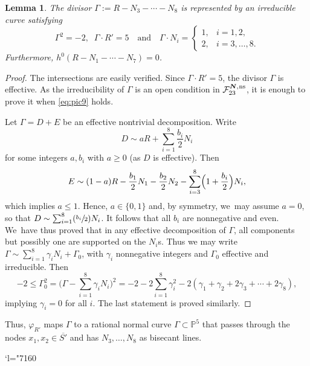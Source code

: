 \documentclass[JEP,XML,SOM,Unicode,NoEqCountersInSection,published]{cedram}
\newcommand{\Changel}{\mathcode`l="7160}
\newcommand{\Psfrac}[2]{(\sfrac{#1}{#2})}
\newcommand{\quand}{\quad\text{and}\quad}
\newcommand{\ns}{{\mkern1mu\mathrm{ns}}}
\newcommand{\bN}{\boldsymbol{N}}
\theoremstyle{plain}
\newtheorem{lemma}[thm]{Lemma}
\theoremstyle{definition}
\newcommand\PP{{\mathbb P}}
\newcommand\F{{\mathcal F}}
\begin{document}
\begin{lemma} \label{lemma:Juve-15}
The divisor $
\Gamma:=R-N_3-\cdots-N_8
$
is represented by an irreducible curve satisfying
\[
 \Gamma^2=-2, \;\; \Gamma\cdot R'=5 \quand\Gamma \cdot N_i =
\begin{cases}
1, & i=1,2, \\
2, & i=3,\ldots,8.
\end{cases}
\]
Furthermore, $h^0(R-N_1-\cdots-N_7)=0$.
\end{lemma}

\begin{proof}
The intersections are easily verified. Since $\Gamma \cdot R'=5$, the divisor $\Gamma$ is effective.
As the irreducibility of $\Gamma$ is an open condition in $\F_{23}^{\bN,\ns}$, it is enough to prove it when \eqref{eq:pic9} holds.

Let $\Gamma=D+E$ be an effective nontrivial decomposition. Write
\[
D \sim aR+\sum_{i=1}^8 \frac{b_i}{2}N_i
\]
for some integers $a,b_i$ with $a \geq 0$ (as $D$ is effective). Then
\[
E \sim (1-a)R-\frac{b_1}{2}N_1-\frac{b_2}{2}N_2 -\sum_{i=3}^8 \Bigl(1+\frac{b_i}{2}\Bigr)N_i,
\]
which implies $a \leq 1$. Hence, $a \in \{0,1\}$ and, by symmetry, we~may assume $a=0$, so that $D \sim \sum_{i=1}^8 \Psfrac{b_i}{2}N_i$. It follows that all $b_i$ are nonnegative and even. We~have thus proved that in any effective decomposition of $\Gamma$, all components but possibly one are supported on the $N_i$s. Thus we may write $\Gamma \sim \sum_{i=1}^8 \gamma_iN_i+\Gamma_0$, with $\gamma_i$ nonnegative integers and $\Gamma_0$ effective and irreducible. Then
\[
 -2 \leq \Gamma_0^2=\biggl(\Gamma -\sum_{i=1}^8 \gamma_iN_i\biggr)^2=
-2-2\sum_{i=1}^8 \gamma_i^2-2(\gamma_1+\gamma_2+2\gamma_3+\cdots+2\gamma_8),
\]
implying $\gamma_i=0$ for all $i$. The last statement is proved similarly.
\end{proof}

Thus, $\varphi_{R'}$ maps $\Gamma$ to a rational normal curve $\Gamma\subset \PP^5$ that passes through the nodes $x_1,x_2\in \overline{S'}$ and has $N_3,\ldots,N_8$ as bisecant lines.

\Changel
\end{document}
